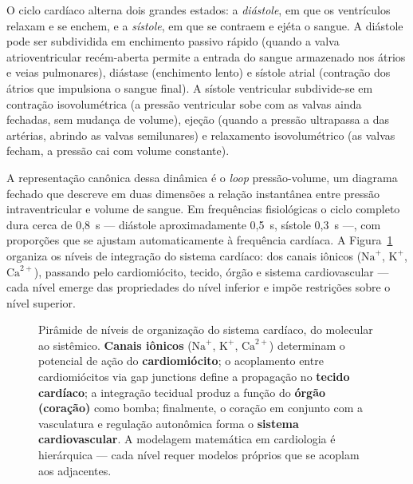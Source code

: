 O ciclo cardíaco alterna dois grandes estados: a \emph{diástole}, em que os
ventrículos relaxam e se enchem, e a \emph{sístole}, em que se contraem e
ejéta o sangue. A diástole pode ser subdividida em enchimento passivo
rápido (quando a valva atrioventricular recém-aberta permite a entrada
do sangue armazenado nos átrios e veias pulmonares), diástase (enchimento
lento) e sístole atrial (contração dos átrios que impulsiona o sangue
final). A sístole ventricular subdivide-se em contração isovolumétrica
(a pressão ventricular sobe com as valvas ainda fechadas, sem mudança de
volume), ejeção (quando a pressão ultrapassa a das artérias, abrindo as
valvas semilunares) e relaxamento isovolumétrico (as valvas fecham, a
pressão cai com volume constante).

A representação canônica dessa dinâmica é o \emph{loop} pressão-volume,
um diagrama fechado que descreve em duas dimensões a relação instantânea
entre pressão intraventricular e volume de sangue. Em frequências
fisiológicas o ciclo completo dura cerca de 0,8~s --- diástole
aproximadamente 0,5~s, sístole 0,3~s ---, com proporções que se ajustam
automaticamente à frequência cardíaca. A Figura~\ref{fig:12-niveis}
organiza os níveis de integração do sistema cardíaco: dos canais
iônicos ($\mathrm{Na}^+$, $\mathrm{K}^+$, $\mathrm{Ca}^{2+}$), passando
pelo cardiomiócito, tecido, órgão e sistema cardiovascular --- cada
nível emerge das propriedades do nível inferior e impõe restrições
sobre o nível superior.

\begin{figure}[htbp]
\centering
{}
\caption{Pirâmide de níveis de organização do sistema cardíaco, do molecular ao sistêmico. \textbf{Canais iônicos} ($\mathrm{Na}^+$, $\mathrm{K}^+$, $\mathrm{Ca}^{2+}$) determinam o potencial de ação do \textbf{cardiomiócito}; o acoplamento entre cardiomiócitos via gap junctions define a propagação no \textbf{tecido cardíaco}; a integração tecidual produz a função do \textbf{órgão (coração)} como bomba; finalmente, o coração em conjunto com a vasculatura e regulação autonômica forma o \textbf{sistema cardiovascular}. A modelagem matemática em cardiologia é hierárquica --- cada nível requer modelos próprios que se acoplam aos adjacentes.}
\label{fig:12-niveis}
\end{figure}

